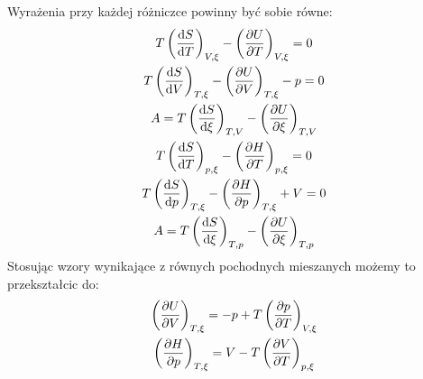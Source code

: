 \documentclass[10pt, a4paper, twoside, onecolumn]{article}
\numberwithin{equation}{section}
\begin{document}
	Wyrażenia przy każdej różniczce powinny być sobie równe:
	\begin{gather}
		T\left(\dv{S}{T}\right)_{V, \xi}-\left(\pdv{U}{T}\right)_{V, \xi}=0 \\
		T\left(\dv{S}{V}\right)_{T, \xi}-\left(\pdv{U}{V}\right)_{T, \xi}-p=0 \\
		A=T\left(\dv{S}{\xi}\right)_{T, V}-\left(\pdv{U}{\xi}\right)_{T, V} \\
		T\left(\dv{S}{T}\right)_{p, \xi}-\left(\pdv{H}{T}\right)_{p, \xi}=0 \\
		T\left(\dv{S}{p}\right)_{T, \xi}-\left(\pdv{H}{p}\right)_{T, \xi}+V=0 \\
		A=T\left(\dv{S}{\xi}\right)_{T, p}-\left(\pdv{U}{\xi}\right)_{T, p}
	\end{gather}
	Stosując wzory wynikające z równych pochodnych mieszanych możemy to przekształcic do: 
	\begin{gather}
		\left(\pdv{U}{V}\right)_{T, \xi}=-p+T\left(\pdv{p}{T}\right)_{V, \xi} \\
		\left(\pdv{H}{p}\right)_{T, \xi}=V-T\left(\pdv{V}{T}\right)_{p, \xi}
	\end{gather}
	\pagebreak
\end{document}
